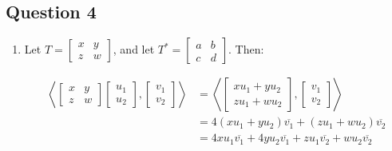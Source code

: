 \documentclass{article}
\begin{document}
\subsection*{Question 4}
\begin{enumerate}[label=(\alph*)]
\item Let $T=\left[\begin{array}{rr}
x & y \\
z & w
\end{array}\right]$, and let $T^* = \left[\begin{array}{rr}
a & b \\
c & d
\end{array}\right]$. Then:

\begin{align*}
    \left \langle \left[\begin{array}{rr}
x & y \\
z & w
\end{array}\right] \left[\begin{array}{r}
u_1  \\
u_2 
\end{array}\right] , \left[\begin{array}{r}
v_1  \\
v_2 
\end{array}\right] \right \rangle &= \left \langle \left[\begin{array}{r}
xu_1 + yu_2 \\
zu_1 + wu_2
\end{array}\right] , \left[\begin{array}{r}
v_1  \\
v_2 
\end{array}\right] \right \rangle \\
&= 4(xu_1 + yu_2) \overline{v_1} + (zu_1+wu_2) \overline{v_2} \\
&= 4xu_1 \overline{v_1} + 4yu_2 \overline{v_1} + zu_1 \overline{v_2} + wu_2 \overline{v_2}
\end{align*}


\end{enumerate}
\end{document}
